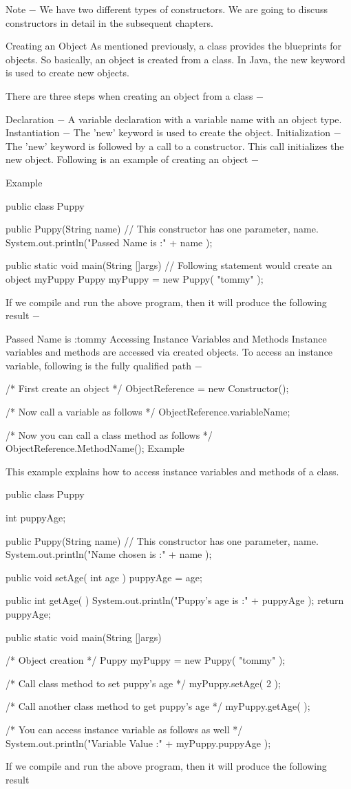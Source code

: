 Note − We have two different types of constructors. We are going to discuss constructors in detail in the subsequent chapters.

Creating an Object
As mentioned previously, a class provides the blueprints for objects. So basically, an object is created from a class. In Java, the new keyword is used to create new objects.

There are three steps when creating an object from a class −

Declaration − A variable declaration with a variable name with an object type.
Instantiation − The 'new' keyword is used to create the object.
Initialization − The 'new' keyword is followed by a call to a constructor. This call initializes the new object.
Following is an example of creating an object −

Example

public class Puppy {
   public Puppy(String name) {
      // This constructor has one parameter, name.
      System.out.println("Passed Name is :" + name );
   }

   public static void main(String []args) {
      // Following statement would create an object myPuppy
      Puppy myPuppy = new Puppy( "tommy" );
   }
}
If we compile and run the above program, then it will produce the following result −

Passed Name is :tommy
Accessing Instance Variables and Methods
Instance variables and methods are accessed via created objects. To access an instance variable, following is the fully qualified path −

/* First create an object */
ObjectReference = new Constructor();

/* Now call a variable as follows */
ObjectReference.variableName;

/* Now you can call a class method as follows */
ObjectReference.MethodName();
Example

This example explains how to access instance variables and methods of a class.

public class Puppy {
   int puppyAge;

   public Puppy(String name) {
      // This constructor has one parameter, name.
      System.out.println("Name chosen is :" + name );
   }

   public void setAge( int age ) {
      puppyAge = age;
   }

   public int getAge( ) {
      System.out.println("Puppy's age is :" + puppyAge );
      return puppyAge;
   }

   public static void main(String []args) {
      /* Object creation */
      Puppy myPuppy = new Puppy( "tommy" );

      /* Call class method to set puppy's age */
      myPuppy.setAge( 2 );

      /* Call another class method to get puppy's age */
      myPuppy.getAge( );

      /* You can access instance variable as follows as well */
      System.out.println("Variable Value :" + myPuppy.puppyAge );
   }
}
If we compile and run the above program, then it will produce the following result

